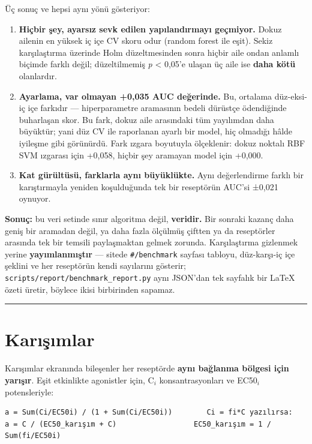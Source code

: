 \documentclass[11pt,a4paper]{article}
\begin{document}
Üç sonuç ve hepsi aynı yönü gösteriyor:

\begin{enumerate}
\item \textbf{Hiçbir şey, ayarsız sevk edilen yapılandırmayı geçmiyor.} Dokuz ailenin en yüksek iç içe CV skoru odur (random forest ile eşit). Sekiz karşılaştırma üzerinde Holm düzeltmesinden sonra hiçbir aile ondan anlamlı biçimde farklı değil; düzeltilmemiş \emph{p} < 0,05'e ulaşan üç aile ise \textbf{daha kötü} olanlardır.
\item \textbf{Ayarlama, var olmayan +0,035 AUC değerinde.} Bu, ortalama düz-eksi-iç içe farkıdır — hiperparametre aramasının bedeli dürüstçe ödendiğinde buharlaşan skor. Bu fark, dokuz aile arasındaki tüm yayılımdan daha büyüktür; yani düz CV ile raporlanan ayarlı bir model, hiç olmadığı hâlde iyileşme gibi görünürdü. Fark ızgara boyutuyla ölçeklenir: dokuz noktalı RBF SVM ızgarası için +0,058, hiçbir şey aramayan model için +0,000.
\item \textbf{Kat gürültüsü, farklarla aynı büyüklükte.} Aynı değerlendirme farklı bir karıştırmayla yeniden koşulduğunda tek bir reseptörün AUC'si ±0,021 oynuyor.
\end{enumerate}

\textbf{Sonuç:} bu veri setinde sınır algoritma değil, \textbf{veridir.} Bir sonraki kazanç daha geniş bir aramadan değil, ya daha fazla ölçülmüş çiftten ya da reseptörler arasında tek bir temsili paylaşmaktan gelmek zorunda. Karşılaştırma gizlenmek yerine \textbf{yayımlanmıştır} — sitede \texttt{\small \#/benchmark} sayfası tabloyu, düz-karşı-iç içe şeklini ve her reseptörün kendi sayılarını gösterir; \texttt{\small scripts/report/benchmark\_report.py} aynı JSON'dan tek sayfalık bir LaTeX özeti üretir, böylece ikisi birbirinden sapamaz.


\vspace{0.4\baselineskip}
\hrule
\vspace{0.9\baselineskip}


\section{Karışımlar}

Karışımlar ekranında bileşenler her reseptörde \textbf{aynı bağlanma bölgesi için yarışır}. Eşit etkinlikte agonistler için, C\(_{i}\) konsantrasyonları ve EC50\(_{i}\) potensleriyle:


\begin{Verbatim}[fontsize=\small, xleftmargin=1em]
a = Sum(Ci/EC50i) / (1 + Sum(Ci/EC50i))        Ci = fi*C yazılırsa:
a = C / (EC50_karışım + C)                  EC50_karışım = 1 / Sum(fi/EC50i)
\end{Verbatim}
\end{document}
